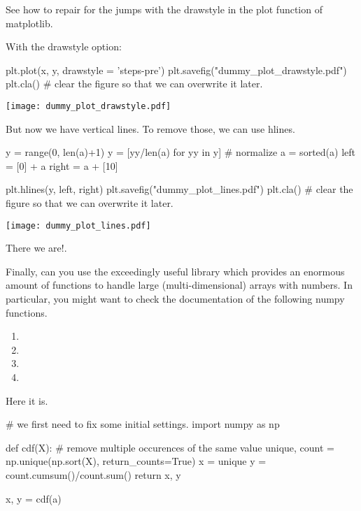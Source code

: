 \documentclass{scrartcl}
\begin{document}
\begin{exercise}
See how to repair for the jumps with the  drawstyle in the plot function of matplotlib.
  \begin{solution}
With the drawstyle option: 
\begin{pyblock}
plt.plot(x, y,  drawstyle = 'steps-pre')
plt.savefig("dummy_plot_drawstyle.pdf")
plt.cla() # clear the figure so that we can overwrite it later.
\end{pyblock}


\begin{center}
\texttt{[image: dummy\_plot\_drawstyle.pdf]}
\end{center}

But now we have  vertical lines. To remove those, we can use hlines.

\begin{pyblock}
y = range(0, len(a)+1)
y = [yy/len(a) for yy in y] # normalize
a = sorted(a)
left = [0] + a
right = a + [10]

plt.hlines(y, left, right)
plt.savefig("dummy_plot_lines.pdf")
plt.cla() # clear the figure so that we can overwrite it later.
\end{pyblock}

\begin{center}
\texttt{[image: dummy\_plot\_lines.pdf]}
\end{center}

There  we are!.
  \end{solution}
\end{exercise}

\begin{exercise}
Finally, can you use the exceedingly useful  library which provides an enormous amount of functions to handle large (multi-dimensional) arrays with numbers. 
In particular,  you might want to check the documentation of the following numpy functions. 
\begin{enumerate}
\item {}
\item {}
\item {}
\item {}
\end{enumerate}
\begin{solution}
Here it is.
\begin{pyblock}
# we first need to fix some initial settings.
import numpy as np

def cdf(X):
    # remove multiple occurences of the same value
    unique, count = np.unique(np.sort(X), return_counts=True)
    x = unique
    y = count.cumsum()/count.sum()
    return x, y

x, y = cdf(a)
\end{pyblock}

\end{solution}
\end{exercise}
\end{document}
